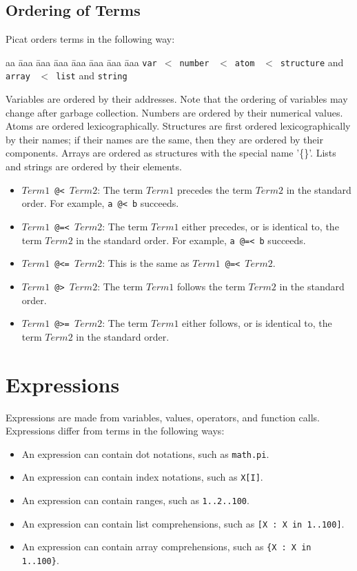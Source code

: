\subsection{Ordering of Terms}
Picat orders terms in the following way:
\begin{tabbing}
aa \= aaa \= aaa \= aaa \= aaa \= aaa \= aaa \= aaa \kill
\> \texttt{var}\ $<$\ \texttt{number} \ $<$\ \texttt{atom} \ $<$\ \texttt{structure} and \texttt{array} \ $<$\ \texttt{list} and \texttt{string}
\end{tabbing}
Variables are ordered by their addresses. Note that the ordering of variables may change after garbage collection. Numbers are ordered by their numerical values. Atoms are ordered lexicographically. Structures are first ordered lexicographically by their names; if their names are the same, then they are ordered by their components. Arrays are ordered as structures with the special name '\{\}'. Lists and strings are ordered by their elements.

\begin{itemize}
\item \texttt{$Term1$ @< $Term2$}: The term $Term1$ precedes the term $Term2$ in the standard order. For example, \texttt{a @< b} succeeds.
\item \texttt{$Term1$ @=< $Term2$}: The term $Term1$ either precedes, or is identical to, the term $Term2$ in the standard order. For example, \texttt{a @=< b} succeeds.
\item \texttt{$Term1$ @<= $Term2$}: This is the same as \texttt{$Term1$ @=< $Term2$}.
\item \texttt{$Term1$ @> $Term2$}: The term $Term1$ follows the term $Term2$ in the standard order.
\item \texttt{$Term1$ @>= $Term2$}: The term $Term1$ either follows, or is identical to, the term $Term2$ in the standard order.
\end{itemize}

\section{Expressions}
Expressions are made from variables, values, operators, and function calls. Expressions differ from terms in the following ways: 
\begin{itemize}
\item An expression can contain dot notations, such as \texttt{math.pi}.
\item An expression can contain index notations, such as \texttt{X[I]}.
\item An expression can contain ranges, such as \texttt{1..2..100}.
\item An expression can contain list comprehensions, such as \texttt{[X : X in 1..100]}.
\item An expression can contain array comprehensions, such as \texttt{\{X : X in 1..100\}}.
\end{itemize}

